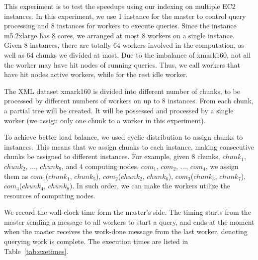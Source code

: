 This experiment is to test the speedups using our indexing on multiple EC2
instances. In this experiment, we use 1 instance for the master to control
query processing and 8 instances for workers to execute queries. Since the
instance m5.2xlarge has 8 cores, we arranged at most 8 workers on a single
instance. Given 8 instances, there are totally 64 workers involved in the
computation, as well as 64 chunks we divided at most. Due to the imbalance of
xmark160, not all the worker may have hit nodes of running queries. Thus, we
call workers that have hit nodes active workers, while for the rest idle
worker. 

The XML dataset xmark160 is divided into different number of chunks, to be
processed by different numbers of workers on up to 8 instances. From each chunk,
a partial tree will be created. It will be possessed and processed by a single
worker (we assign only one chunk to a worker in this experiment). 

To achieve better load balance, we used cyclic distribution to assign chunks to
instances. This means that we assign chunks to each instance, making consecutive
chunks be assigned to different instances. For example, given 8 chunks, $chunk_1$,
$chunk_2$, ..., $chunk_9$,  and 4 computing nodes, $com_1$, $com_2$, ..., $com_4$, 
we assign them as 
$com_1$($chunk_1$, $chunk_5$), 
$com_2$($chunk_2$, $chunk_6$), 
$com_3$($chunk_3$, $chunk_7$), 
$com_4$($chunk_4$, $chunk_8$). 
In such order, we can make the workers utilize the resources of computing nodes. 

We record the wall-clock time form the master's side. The timing starts from the
master sending a message to all workers to start a query, and ends at the moment
when the master receives the work-done message from the last worker, denoting
querying work is complete. The execution times are listed in
Table~\ref{tab:exetimes}.


